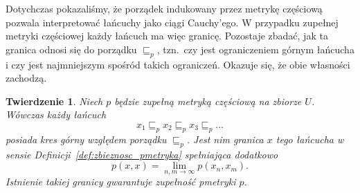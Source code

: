 \documentclass[11pt,a4paper]{article}
\theoremstyle{definition}
\theoremstyle{plain}
\newtheorem{twierdzenie}[definicja]{Twierdzenie}
\begin{document}
Dotychczas pokazaliśmy, że porządek indukowany przez metrykę częściową
pozwala interpretować łańcuchy jako ciągi Cauchy'ego. W przypadku
zupełnej metryki częściowej każdy łańcuch ma więc granicę. Pozostaje
zbadać, jak ta granica odnosi się do porządku $\sqsubseteq_p$, tzn.\ czy
jest ograniczeniem górnym łańcucha i czy jest najmniejszym spośród
takich ograniczeń. Okazuje się, że obie własności zachodzą.

\begin{twierdzenie}\label{tw:granica_kresem_gornym}
	Niech $p$ będzie zupełną metryką częściową na zbiorze $U$. Wówczas
	każdy łańcuch
	\[
	x_1\sqsubseteq_p x_2\sqsubseteq_p x_3\sqsubseteq_p\ldots
	\]
	posiada kres górny względem porządku $\sqsubseteq_p$. Jest nim granica
	$x$ tego łańcucha w sensie Definicji~\ref{def:zbieznosc_pmetryka}
	spełniająca dodatkowo
	\[
	p(x,x)=\lim_{n,m\to\infty}p(x_n,x_m).
	\]
	Istnienie takiej granicy gwarantuje zupełność pmetryki $p$.
\end{twierdzenie}
\end{document}
